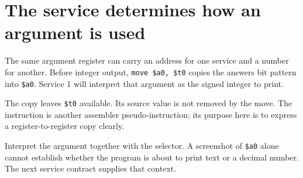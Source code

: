 \section{The service determines how an argument is
  used}\label{001-console-calculation-p14-the-service-determines-how-an-argument-is-used}

The same argument register can carry an address for one service and a
number for another. Before integer output, \texttt{move\ \$a0,\ \$t0}
copies the answer\textquotesingle s bit pattern into \texttt{\$a0}.
Service 1 will interpret that argument as the signed integer to print.

The copy leaves \texttt{\$t0} available. Its source value is not removed
by the move. The instruction is another assembler pseudo-instruction;
its purpose here is to express a register-to-register copy clearly.

Interpret the argument together with the selector. A screenshot of
\texttt{\$a0} alone cannot establish whether the program is about to
print text or a decimal number. The next service contract supplies that
context.
